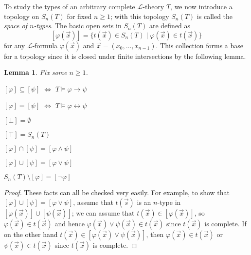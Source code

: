 \documentclass[10pt]{amsart}
\renewcommand{\L}{\mathcal{L}}
\newtheorem{lemma}[theorem]{Lemma}
\theoremstyle{definition}
\theoremstyle{remark}
\newenvironment{enumerate-(a)}{\begin{enumerate}[label={\upshape (\alph*)}, leftmargin=2pc]}{\end{enumerate}}
\begin{document}
To study the types of an arbitrary complete $\L$-theory $T$, we now introduce a topology on $S_n(T)$ for fixed $n\geq 1$; with this topology $S_n(T)$ is called the \emph{space of $n$-types}. The basic open sets in $S_n(T)$ are defined as 
$$[\varphi(\vec{x})]=\{t(\vec{x})\in S_n(T)\mid \varphi(\vec{x})\in t(\vec{x})\}$$ 
for any $\L$-formula $\varphi(\vec{x})$ and $\vec{x}=(x_0,\dots,x_{n-1})$. This collection forms a base for a topology since it is closed under finite intersections by the following lemma. 

\begin{lemma} 
Fix some $n\geq 1$. 
\begin{enumerate-(a)} 
\item 
$[\varphi]\subseteq [\psi]$ $\Leftrightarrow$ $T\models \varphi \rightarrow \psi$ 
\item 
$[\varphi]= [\psi]$ $\Leftrightarrow$ $T\models \varphi \leftrightarrow \psi$ 
\item 
$[\bot]=\emptyset$ 
\item
 $[\top]=S_n(T)$ 
\item 
$[\varphi]\cap[\psi]= [\varphi\wedge \psi]$ 
\item 
$[\varphi]\cup[\psi]= [\varphi\vee \psi]$ 
\item 
$S_n(T)\setminus [\varphi]= [\neg \varphi]$ 
\end{enumerate-(a)} 
\end{lemma} 
\begin{proof} 
These facts can all be checked very easily. For example, to show that $[\varphi]\cup[\psi]= [\varphi\vee \psi]$, assume that $t(\vec{s})$ is an $n$-type in $[\varphi(\vec{x})]\cup[\psi(\vec{x})]$; we can assume that $t(\vec{x})\in[\varphi(\vec{x})]$, so $\varphi(\vec{x})\in t(\vec{x})$ and hence $\varphi(\vec{x})\vee\psi(\vec{x})\in t(\vec{x})$ since $t(\vec{x})$ is complete. If on the other hand $t(\vec{x})\in[\varphi(\vec{x})\vee\psi(\vec{x})]$, then $\varphi(\vec{x})\in t(\vec{x})$ or $\psi(\vec{x})\in t(\vec{x})$ since $t(\vec{x})$ is complete. 
\end{proof} 

\end{document}
